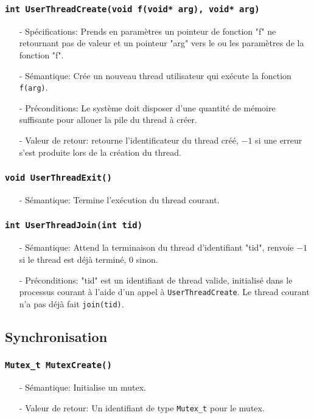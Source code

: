 \documentclass[11pt]{article}
\theoremstyle{definition}
\theoremstyle{definition}
\begin{document}
\subsubsection{\texttt{int UserThreadCreate(void f(void* arg), void* arg)}}
\begin{itemize}
\item[-] Spécifications: Prends en paramètres un pointeur de fonction "f" ne retournant pas de valeur
  et un pointeur "arg" vers le ou les paramètres de la fonction "f".
\item[-] Sémantique: Crée un nouveau thread utilisateur qui exécute la fonction \texttt{f(arg)}. 
\item[-] Préconditions: Le système doit disposer d'une quantité de mémoire suffisante pour allouer la
  pile du thread à créer. 
\item[-] Valeur de retour: retourne l'identificateur du thread créé, $-1$ si une erreur s'est produite lors de
  la création du thread.
\end{itemize}

\subsubsection{\texttt{void UserThreadExit()}}
\begin{itemize}
\item[-] Sémantique: Termine l'exécution du thread courant.
\end{itemize}

\subsubsection{\texttt{int UserThreadJoin(int tid)}}
\begin{itemize}
\item[-] Sémantique: Attend la terminaison du thread d'identifiant "tid", renvoie $-1$
  si le thread est déjà terminé, $0$ sinon.
\item[-] Préconditions: "tid" est un identifiant de thread valide, initialisé dans le processus courant
  à l'aide d'un appel à \texttt{UserThreadCreate}. Le thread courant n'a pas déjà fait \texttt{join(tid)}.
\end{itemize}

\subsection{Synchronisation}
\subsubsection{\texttt{Mutex\_t MutexCreate()}}
\begin{itemize}
\item[-]Sémantique: Initialise un mutex.
\item[-]Valeur de retour: Un identifiant de type \texttt{Mutex\_t} pour le mutex.
\end{itemize}
\end{document}
